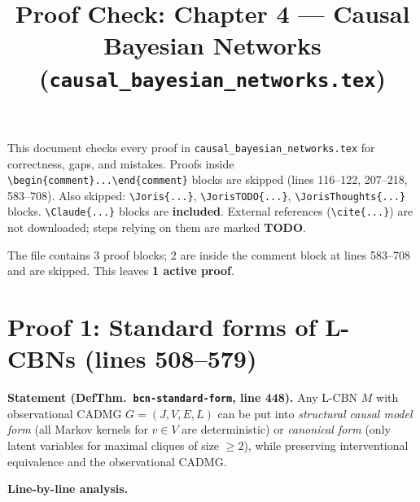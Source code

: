 \documentclass{article}
\title{Proof Check: Chapter 4 --- Causal Bayesian Networks\\(\texttt{causal\_bayesian\_networks.tex})}
\date{}
\begin{document}
\maketitle

This document checks every proof in \texttt{causal\_bayesian\_networks.tex} for
correctness, gaps, and mistakes.
Proofs inside \verb|\begin{comment}...\end{comment}| blocks are skipped
(lines 116--122, 207--218, 583--708).
Also skipped: \verb|\Joris{...}|, \verb|\JorisTODO{...}|,
\verb|\JorisThoughts{...}| blocks.
\verb|\Claude{...}| blocks are \textbf{included}.
External references (\verb|\cite{...}|) are not downloaded; steps relying on
them are marked \textbf{TODO}.

The file contains 3 proof blocks; 2 are inside the comment block at lines
583--708 and are skipped.  This leaves \textbf{1 active proof}.

\section{Proof 1: Standard forms of L-CBNs (lines 508--579)}

\textbf{Statement (DefThm.\ \texttt{bcn-standard-form}, line 448).}
Any L-CBN $M$ with observational CADMG $G=(J,V,E,L)$ can be put into
\emph{structural causal model form} (all Markov kernels for $v\in V$ are
deterministic) or \emph{canonical form} (only latent variables for maximal
cliques of size $\ge 2$), while preserving interventional equivalence and
the observational CADMG.

\textbf{Line-by-line analysis.}
\end{document}
